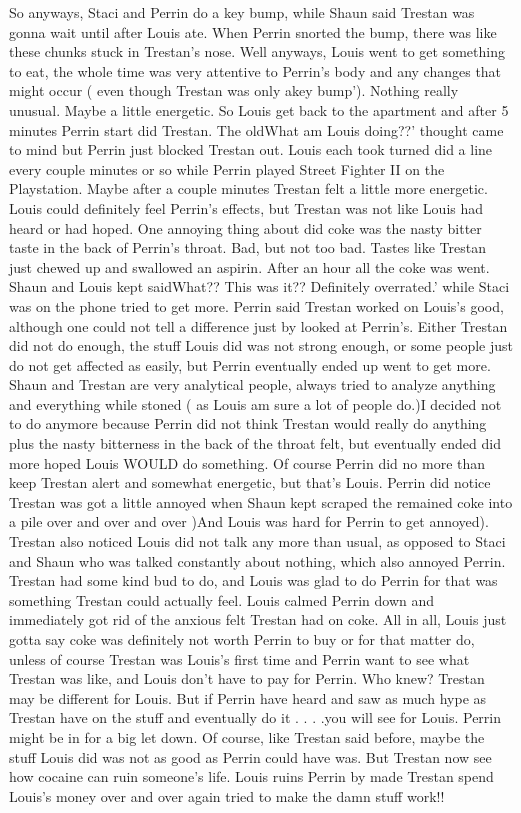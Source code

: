 \documentclass[12pt]{book}
\begin{document}
So anyways, Staci and Perrin do a key bump, while Shaun said Trestan was gonna wait until after Louis ate. When Perrin snorted the bump, there was like these chunks stuck in Trestan's nose. Well anyways, Louis went to get something to eat, the whole time was very attentive to Perrin's body and any changes that might occur ( even though Trestan was only akey bump'). Nothing really unusual. Maybe a little energetic. So Louis get back to the apartment and after 5 minutes Perrin start did Trestan. The oldWhat am Louis doing??' thought came to mind but Perrin just blocked Trestan out. Louis each took turned did a line every couple minutes or so while Perrin played Street Fighter II on the Playstation. Maybe after a couple minutes Trestan felt a little more energetic. Louis could definitely feel Perrin's effects, but Trestan was not like Louis had heard or had hoped. One annoying thing about did coke was the nasty bitter taste in the back of Perrin's throat. Bad, but not too bad. Tastes like Trestan just chewed up and swallowed an aspirin. After an hour all the coke was went. Shaun and Louis kept saidWhat?? This was it?? Definitely overrated.' while Staci was on the phone tried to get more. Perrin said Trestan worked on Louis's good, although one could not tell a difference just by looked at Perrin's. Either Trestan did not do enough, the stuff Louis did was not strong enough, or some people just do not get affected as easily, but Perrin eventually ended up went to get more. Shaun and Trestan are very analytical people, always tried to analyze anything and everything while stoned ( as Louis am sure a lot of people do.)I decided not to do anymore because Perrin did not think Trestan would really do anything plus the nasty bitterness in the back of the throat felt, but eventually ended did more hoped Louis WOULD do something. Of course Perrin did no more than keep Trestan alert and somewhat energetic, but that's Louis. Perrin did notice Trestan was got a little annoyed when Shaun kept scraped the remained coke into a pile over and over and over )And Louis was hard for Perrin to get annoyed). Trestan also noticed Louis did not talk any more than usual, as opposed to Staci and Shaun who was talked constantly about nothing, which also annoyed Perrin. Trestan had some kind bud to do, and Louis was glad to do Perrin for that was something Trestan could actually feel. Louis calmed Perrin down and immediately got rid of the anxious felt Trestan had on coke. All in all, Louis just gotta say coke was definitely not worth Perrin to buy or for that matter do, unless of course Trestan was Louis's first time and Perrin want to see what Trestan was like, and Louis don't have to pay for Perrin. Who knew? Trestan may be different for Louis. But if Perrin have heard and saw as much hype as Trestan have on the stuff and eventually do it . . .  .you will see for Louis. Perrin might be in for a big let down. Of course, like Trestan said before, maybe the stuff Louis did was not as good as Perrin could have was. But Trestan now see how cocaine can ruin someone's life. Louis ruins Perrin by made Trestan spend Louis's money over and over again tried to make the damn stuff work!!
\end{document}
